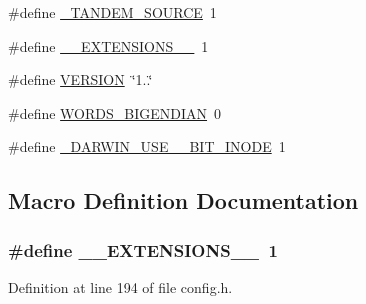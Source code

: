 \begin{DoxyCompactItemize}
\item 
\#define \hyperlink{mac_2config_2i386_2lib-src_2libflac_2config_8h_aca41d2cbf86c3393115fc92f87289dff}{\+\_\+\+T\+A\+N\+D\+E\+M\+\_\+\+S\+O\+U\+R\+CE}~1
\item 
\#define \hyperlink{mac_2config_2i386_2lib-src_2libflac_2config_8h_ab27cf1abd092548f1c51632e6ae35a37}{\+\_\+\+\_\+\+E\+X\+T\+E\+N\+S\+I\+O\+N\+S\+\_\+\+\_\+}~1
\item 
\#define \hyperlink{mac_2config_2i386_2lib-src_2libflac_2config_8h_a1c6d5de492ac61ad29aec7aa9a436bbf}{V\+E\+R\+S\+I\+ON}~\char`\"{}1..\char`\"{}
\item 
\#define \hyperlink{mac_2config_2i386_2lib-src_2libflac_2config_8h_a82e69009d3cd108c8aad8afe44fb1132}{W\+O\+R\+D\+S\+\_\+\+B\+I\+G\+E\+N\+D\+I\+AN}~0
\item 
\#define \hyperlink{mac_2config_2i386_2lib-src_2libflac_2config_8h_a41a19566302a3a56b518eb92c8a4cb2b}{\+\_\+\+D\+A\+R\+W\+I\+N\+\_\+\+U\+S\+E\+\_\+\_\+\+B\+I\+T\+\_\+\+I\+N\+O\+DE}~1
\end{DoxyCompactItemize}


\subsection{Macro Definition Documentation}
\subsubsection[{\texorpdfstring{\+\_\+\+\_\+\+E\+X\+T\+E\+N\+S\+I\+O\+N\+S\+\_\+\+\_\+}{__EXTENSIONS__}}]{\setlength{\rightskip}{0pt plus 5cm}\#define \+\_\+\+\_\+\+E\+X\+T\+E\+N\+S\+I\+O\+N\+S\+\_\+\+\_\+~1}\hypertarget{mac_2config_2i386_2lib-src_2libflac_2config_8h_ab27cf1abd092548f1c51632e6ae35a37}{}\label{mac_2config_2i386_2lib-src_2libflac_2config_8h_ab27cf1abd092548f1c51632e6ae35a37}


Definition at line 194 of file config.\+h.

